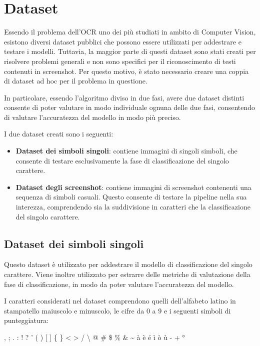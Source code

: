 \chapter{Dataset}
\label{ch:dataset}

Essendo il problema dell'OCR uno dei più studiati in ambito di Computer Vision, esistono diversi dataset pubblici che possono essere utilizzati per addestrare e testare i modelli. Tuttavia, la maggior parte di questi dataset sono stati creati per risolvere problemi generali e non sono specifici per il riconoscimento di testi contenuti in screenshot. Per questo motivo, è stato necessario creare una coppia di dataset ad hoc per il problema in questione.

In particolare, essendo l'algoritmo diviso in due fasi, avere due dataset distinti consente di poter valutare in modo individuale ognuna delle due fasi, consentendo di valutare l'accuratezza del modello in modo più preciso.

I due dataset creati sono i seguenti:
\begin{itemize}
	\item \textbf{Dataset dei simboli singoli}: contiene immagini di singoli simboli, che consente di testare esclusivamente la fase di classificazione del singolo carattere.
	\item \textbf{Dataset degli screenshot}:  contiene immagini di screenshot contenenti una sequenza di simboli casuali. Questo consente di testare la pipeline nella sua interezza, comprendendo sia la suddivisione in caratteri che la classificazione del singolo carattere.
\end{itemize}

\section{Dataset dei simboli singoli}
\label{sec:single_dataset}

Questo dataset è utilizzato per addestrare il modello di classificazione del singolo carattere. Viene inoltre utilizzato per estrarre delle metriche di valutazione della fase di classificazione, in modo da poter valutare l'accuratezza del modello.

I caratteri considerati nel dataset comprendono quelli dell'alfabeto latino in stampatello maiuscolo e minuscolo, le cifre da 0 a 9 e i seguenti simboli di punteggiatura:

\begin{center}
, ; . : ! ? ' ( ) [ ] \{ \} \textless{} \textgreater{} / \textbackslash{} @ \# \$ \texteuro{} \textsterling{} \% \& \textasciitilde{} à è é ì ò ù - + °
\end{center}

